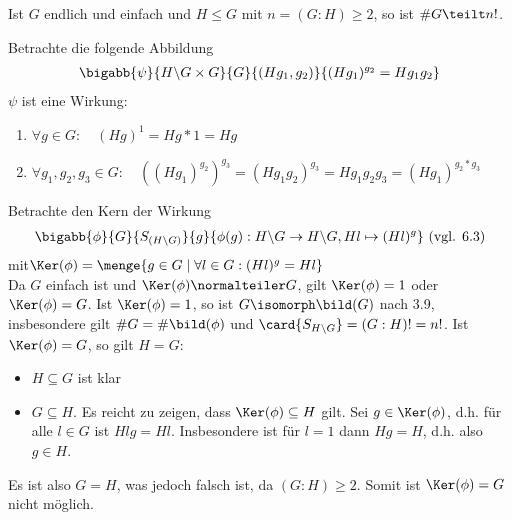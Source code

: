 \begin{uebungsblatt}
	\begin{uebung}
		Ist $G$ endlich und einfach und $H \leq G$ mit $n = (G:H) \geq 2$, so ist $\# G \teilt n!$.
	\end{uebung}
	\begin{loesung}
		Betrachte die folgende Abbildung
		\begin{align*}
			\bigabb{\psi}{H \backslash G \times G}{G}{(Hg_1, g_2)}{(Hg_1)^{g_2} = H g_1 g_2}
		\end{align*}
		$\psi$ ist eine Wirkung:
		\begin{enumerate}[label=(\roman*)]
			\item $\forall g \in G : \quad (Hg)^1 = Hg*1 = Hg$
			\item $\forall g_1, g_2, g_3 \in G: \quad \left((Hg_1)^{g_2}\right)^{g_3} = \left( Hg_1 g_2 \right)^{g_3} = H g_1 g_2 g_3 = \left( H g_1 \right)^{g_2 * g_3}$
		\end{enumerate}
		Betrachte den Kern der Wirkung 
		\begin{align*}
			\bigabb{\phi}{G}{S_{(H \backslash G)}}{g}{\phi(g) : H \backslash G \to H \backslash G, Hl \mapsto (Hl)^g} \text{ (vgl. 6.3)}
		\end{align*}
		mit$\Ker(\phi) = \menge{g \in G \mid \forall l \in G : (Hl)^g = Hl}$ \\
		Da $G$ einfach ist und $\Ker(\phi) \normalteiler G$, gilt $\Ker(\phi) = 1$ oder $\Ker(\phi) = G$. Ist $\Ker(\phi) = 1$, so ist $G \isomorph \bild(G)$ nach 3.9, insbesondere gilt $\# G = \# \bild(\phi)$ und $\card{S_{H \backslash G}} = (G:H)! = n!$. Ist $\Ker(\phi) = G$, so gilt $H = G$:
		\begin{itemize}
			\item $H \subseteq G$ ist klar
			\item $G \subseteq H$. Es reicht zu zeigen, dass $\Ker(\phi) \subseteq H$ gilt. Sei $g \in \Ker(\phi)$, d.h. für alle $l \in G$ ist $Hlg = Hl$. Insbesondere ist für $l=1$ dann $Hg=H$, d.h. also $g \in H$.
		\end{itemize}
	Es ist also $G=H$, was jedoch falsch ist, da $(G:H) \geq 2$. Somit ist $\Ker(\phi) = G$ nicht möglich.
	\end{loesung}


\end{uebungsblatt}
